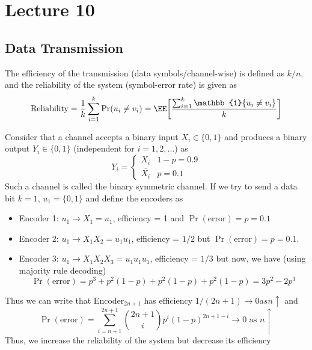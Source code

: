 \chapter{Lecture 10}
\section{Data Transmission}
\begin{figure}[H]
\centering
{}
\end{figure}
The efficiency of the transmission (data symbols/channel-wise) is defined as $k/n$, and the reliability of the system (symbol-error rate) is given as 
\[\text{Reliability} = \frac{1}{k} \sum_{i=1}^k \Pr(u_i \neq v_i) = \EE\bigg[\frac{\sum_{i=1}^k \mathbb{1}\{u_i \neq v_i\}}{k}\bigg]\]
\begin{eg}
Consider that a channel accepts a binary input $X_i \in \{0,1\}$ and produces a binary output $Y_i \in \{0, 1\}$ (independent for $i=1, 2, \dots$) as
\[Y_i = \begin{cases}
X_i & 1-p = 0.9 \\
\overline{X_i} & p = 0.1
\end{cases}
\]
Such a channel is called the binary symmetric channel. If we try to send a data bit $k=1$, $u_1 = \{0, 1\}$ and define the encoders as
\begin{itemize}
    \item Encoder 1: $u_1\to X_1 = u_1$, efficiency = 1 and $\Pr(\text{error}) = p = 0.1$
    \item Encoder 2: $u_1 \to X_1X_2 = u_1u_1$, efficiency = $1/2$ but $\Pr(\text{error}) = p = 0.1$.
    \item Encoder 3: $u_1 \to X_1X_2X_3 = u_1u_1u_1$, efficiency = $1/3$ but now, we have (using majority rule decoding)
    \[\Pr(\text{error}) = p^3 + p^2(1-p) + p^2(1-p) + p^2(1-p) = 3p^2-2p^3\]
\end{itemize}
Thus we can write that Encoder$_{2n+1}$ has efficiency $1/(2n+1) \to 0 as n\uparrow$ and 
\[\Pr(\text{error}) = \sum_{i=n+1}^{2n+1} \binom{2n+1}{i} p^i (1-p)^{2n+1-i} \to 0 \text{ as } n\uparrow\]
Thus, we increase the reliability of the system but decrease its efficiency
\end{eg}
